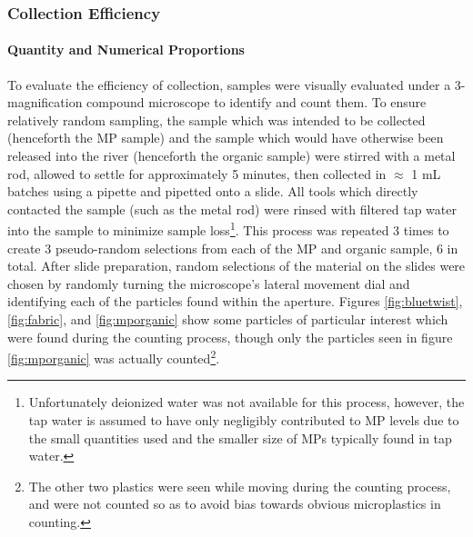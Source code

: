 \documentclass[fleqn,10pt]{SelfArx} %
\begin{document}
	\subsubsection{Collection Efficiency}
	\paragraph{Quantity and Numerical Proportions}
	To evaluate the efficiency of collection, samples were visually evaluated under a 3-magnification compound microscope to identify and count them. To ensure relatively random sampling, the sample which was intended to be collected (henceforth the MP sample) and the sample which would have otherwise been released into the river (henceforth the organic sample) were stirred with a metal rod, allowed to settle for approximately 5 minutes, then collected in $\approx$ 1 mL batches using a pipette and pipetted onto a slide. All tools which directly contacted the sample (such as the metal rod) were rinsed with filtered tap water into the sample to minimize sample loss\footnote{Unfortunately deionized water was not available for this process, however, the tap water is assumed to have only negligibly contributed to MP levels due to the small quantities used and the smaller size of MPs typically found in tap water.}. This process was repeated 3 times to create 3 pseudo-random selections from each of the MP and organic sample, 6 in total. After slide preparation, random selections of the material on the slides were chosen by randomly turning the microscope's lateral movement dial and identifying each of the particles found within the aperture. 
	Figures \ref{fig:bluetwist}, \ref{fig:fabric}, and \ref{fig:mporganic} show some particles of particular interest which were found during the counting process, though only the particles seen in figure \ref{fig:mporganic} was actually counted\footnote{The other two plastics were seen while moving during the counting process, and were not counted so as to avoid bias towards obvious microplastics in counting.}.
	
\end{document}
